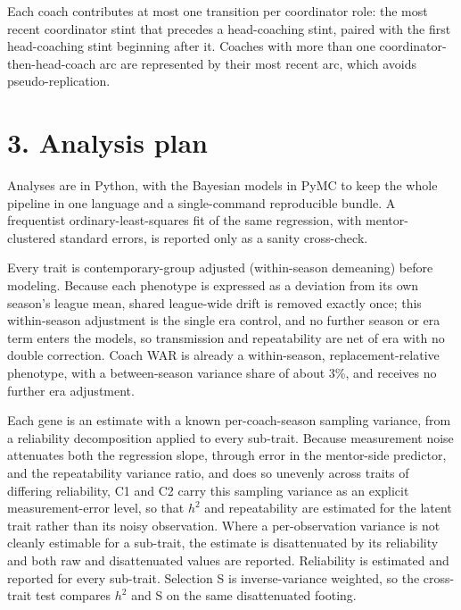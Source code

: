 \documentclass[11pt]{article}
\begin{document}
Each coach contributes at most one transition per coordinator role: the most recent coordinator stint that precedes a head-coaching stint, paired with the first head-coaching stint beginning after it. Coaches with more than one coordinator-then-head-coach arc are represented by their most recent arc, which avoids pseudo-replication.

\section*{3. Analysis plan}

Analyses are in Python, with the Bayesian models in PyMC to keep the whole pipeline in one language and a single-command reproducible bundle. A frequentist ordinary-least-squares fit of the same regression, with mentor-clustered standard errors, is reported only as a sanity cross-check.

Every trait is contemporary-group adjusted (within-season demeaning) before modeling. Because each phenotype is expressed as a deviation from its own season's league mean, shared league-wide drift is removed exactly once; this within-season adjustment is the single era control, and no further season or era term enters the models, so transmission and repeatability are net of era with no double correction. Coach WAR is already a within-season, replacement-relative phenotype, with a between-season variance share of about 3\%, and receives no further era adjustment.

Each gene is an estimate with a known per-coach-season sampling variance, from a reliability decomposition applied to every sub-trait. Because measurement noise attenuates both the regression slope, through error in the mentor-side predictor, and the repeatability variance ratio, and does so unevenly across traits of differing reliability, C1 and C2 carry this sampling variance as an explicit measurement-error level, so that $h^{2}$ and repeatability are estimated for the latent trait rather than its noisy observation. Where a per-observation variance is not cleanly estimable for a sub-trait, the estimate is disattenuated by its reliability and both raw and disattenuated values are reported. Reliability is estimated and reported for every sub-trait. Selection S is inverse-variance weighted, so the cross-trait test compares $h^{2}$ and S on the same disattenuated footing.
\end{document}
